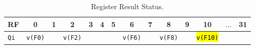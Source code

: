 \begin{enumerate}
    \begin{table}[!htp]
        \centering
        \begin{adjustbox}{width={\textwidth},totalheight={\textheight},keepaspectratio}
            \begin{tabular}{@{} l | c c c c c c c c c c c c c @{}}
                \toprule
                RF              & 0                     & 1             & 2                     & 3             & 4             & 5             & 6                     & 7             & 8                     & 9             & 10                    & $\dots$           & 31            \\
                \midrule
                \texttt{Qi}     & \texttt{v(F0)}        &               & \texttt{v(F2)}        &               &               &               & \texttt{v(F6)}        &               & \texttt{v(F8)}        &               & \hl{\texttt{v(F10)}}  &                   &               \\
                \bottomrule
            \end{tabular}   
        \end{adjustbox}
        \caption*{Register Result Status.}
    \end{table}
\end{enumerate}